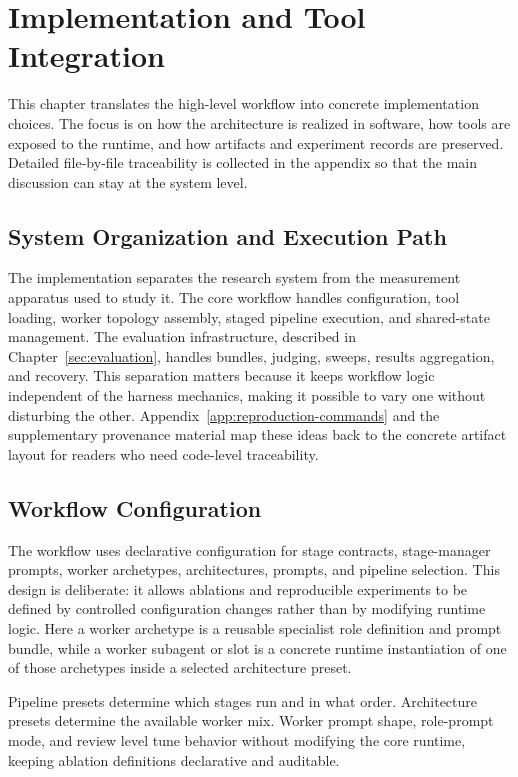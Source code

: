 \chapter{Implementation and Tool Integration}
\label{sec:implementation}

This chapter translates the high-level workflow into concrete implementation choices. The focus is on how the architecture is realized in software, how tools are exposed to the runtime, and how artifacts and experiment records are preserved. Detailed file-by-file traceability is collected in the appendix so that the main discussion can stay at the system level.

\section{System Organization and Execution Path}

The implementation separates the research system from the measurement apparatus used to study it. The core workflow handles configuration, tool loading, worker topology assembly, staged pipeline execution, and shared-state management. The evaluation infrastructure, described in Chapter~\ref{sec:evaluation}, handles bundles, judging, sweeps, results aggregation, and recovery. This separation matters because it keeps workflow logic independent of the harness mechanics, making it possible to vary one without disturbing the other. Appendix~\ref{app:reproduction-commands} and the supplementary provenance material map these ideas back to the concrete artifact layout for readers who need code-level traceability.

\section{Workflow Configuration}

The workflow uses declarative configuration for stage contracts, stage-manager prompts, worker archetypes, architectures, prompts, and pipeline selection. This design is deliberate: it allows ablations and reproducible experiments to be defined by controlled configuration changes rather than by modifying runtime logic. Here a worker archetype is a reusable specialist role definition and prompt bundle, while a worker subagent or slot is a concrete runtime instantiation of one of those archetypes inside a selected architecture preset.

Pipeline presets determine which stages run and in what order. Architecture presets determine the available worker mix. Worker prompt shape, role-prompt mode, and review level tune behavior without modifying the core runtime, keeping ablation definitions declarative and auditable.

